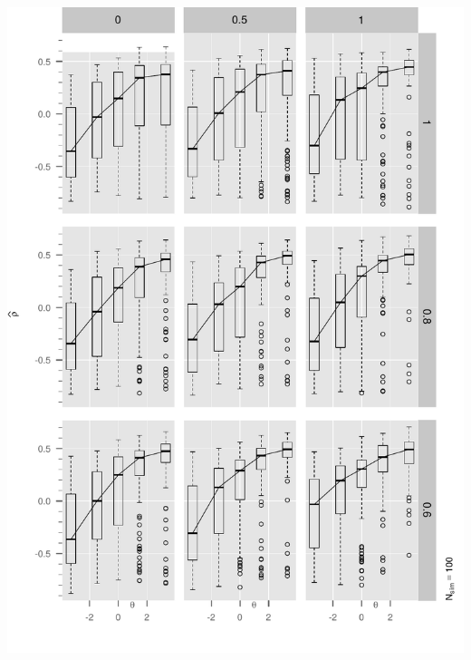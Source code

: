 \begin{frame}[fragile]

\begin{center}
  \includegraphics[width=1.00\textwidth]{Figure2/boxplotArray2.pdf}
\end{center}

\end{frame}